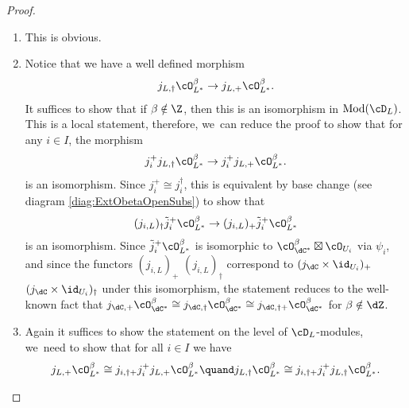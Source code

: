 \skpt
\begin{proof}
\begin{enumerate}
\item
This is obvious.

\item
Notice that we have a well defined morphism
\[
j_{L,\dag} \cO_{L^*}^\beta \to j_{L,+} \cO_{L^*}^\beta.
\]
It suffices to show that if $\beta\notin\Z$, then this is an isomorphism in $\textup{Mod}(\cD_L)$. This is a local statement, therefore, we~can reduce the proof to show that for any $i\in I$, the morphism
\[
j_i^+j_{L,\dag} \cO_{L^*}^\beta \to j_i^+j_{L,+} \cO_{L^*}^\beta.
\]
is an isomorphism. Since $j_i^+\cong j_i^\dag$, this is equivalent by base change (see diagram \eqref{diag:ExtObetaOpenSubs}) to show that
\[
(j_{i,L})_\dag\tilde{j}_i^+ \cO_{L^*}^\beta \to
(j_{i,L})_+\tilde{j}_i^+ \cO_{L^*}^\beta
\]
is an isomorphism. Since $\tilde{j}_i^+ \cO_{L^*}^\beta$ is isomorphic to
$\cO^\beta_{\dC^*}\boxtimes \cO_{U_i}$ via $\psi_i$, and since the functors $(j_{i,L})_+$ \resp $(j_{i,L})_\dag$ correspond to $(j_\dC\times\id_{U_i})_+$ \resp $(j_\dC\times\id_{U_i})_\dag$ under this isomorphism, the statement reduces to the well-known fact that
$j_{\dC,+}\cO_{\dC^*}^\beta\cong j_{\dC,\dag}\cO_{\dC^*}^\beta\cong j_{\dC,\dag+}\cO^\beta_{\dC^*}$ for $\beta\notin\dZ$.
\item

Again it suffices to show the statement on the level of $\cD_L$\nobreakdash-mod\-ules, \ie we~need to show that for all $i\in I$ we have
\begin{equation}\label{eq:MinExt}
j_{L,+} \cO^\beta_{L^{*}} \cong j_{i,\dag+} j_i^+ j_{L,+} \cO^\beta_{L^{*}}
\quand
j_{L,\dag} \cO^\beta_{L^{*}} \cong
j_{i,\dag+} j_i^+ j_{L,\dag} \cO^\beta_{L^{*}}.
\end{equation}


\end{enumerate}
\end{proof}
